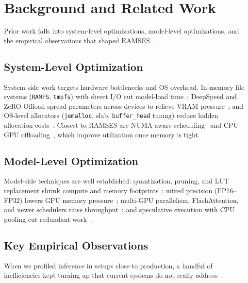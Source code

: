 
\section{Background and Related Work}\label{sec:background}

Prior work falls into system-level optimizations, model-level optimizations, and the empirical observations that shaped RAMSES~\cite{swapAdvisor2020,miao2025survey,li2024llmserving,liu2025survey}.

\subsection{System-Level Optimization}
System-side work targets hardware bottlenecks and OS overhead. In-memory file systems (\texttt{RAMFS}, \texttt{tmpfs}) with direct I/O cut model-load time~\cite{chen2023cpugpu,beaumont2020optimal}; DeepSpeed and ZeRO-Offload spread parameters across devices to relieve VRAM pressure~\cite{aminabadi2022deepspeed,stojkovic2025dynamollm}; and OS-level allocators (\texttt{jemalloc}, slab, \texttt{buffer\_head} tuning) reduce hidden allocation costs~\cite{hunter2021hugepage,yang2023numalloc,milic2017socket}. Closest to RAMSES are NUMA-aware scheduling~\cite{li2024llmserving,du2025prefillonly} and CPU--GPU offloading~\cite{jiang2024neo,zhuge2025specoffload,sarkar2023edgemoe,wang2020offloading}, which improve utilization once memory is tight.

\subsection{Model-Level Optimization}
Model-side techniques are well established: quantization, pruning, and LUT replacement shrink compute and memory footprints~\cite{frantar2023sparsegpt,korthikanti2023reducing}; mixed precision (FP16--FP32) lowers GPU memory pressure~\cite{huang2019gpipe}; multi-GPU parallelism, FlashAttention, and newer schedulers raise throughput~\cite{dao2022flashattention,du2025prefillonly,yu2022orca}; and speculative execution with CPU pooling cut redundant work~\cite{xu2024pie,li2025multillm}.

\subsection{Key Empirical Observations}
\label{sec:observations}

When we profiled inference in setups close to production, a handful of inefficiencies kept turning up that current systems do not really address~\cite{miao2025survey,li2024llmserving,liu2025survey}.

